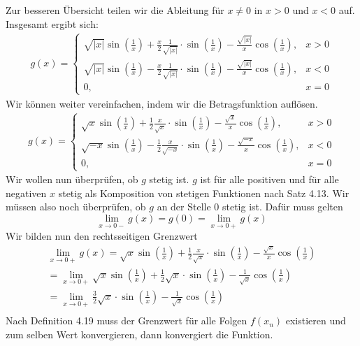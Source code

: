 \documentclass{article}
\begin{document}
    Zur besseren Übersicht teilen wir die Ableitung für \(x \neq 0\) in \(x > 0\) und \(x < 0\) auf. Insgesamt ergibt sich:
    \begin{gather*}
        g(x) = 
        \begin{cases}
            \sqrt{|x|} \sin(\frac{1}{x}) + \frac{x}{2} \frac{1}{\sqrt{|x|}} \cdot \sin(\frac{1}{x}) - \frac{ \sqrt{|x|} }{x} \cos(\frac{1}{x}), & x > 0 \\
            \sqrt{|x|} \sin(\frac{1}{x}) - \frac{x}{2} \frac{1}{\sqrt{|x|}} \cdot \sin(\frac{1}{x}) - \frac{ \sqrt{|x|} }{x} \cos(\frac{1}{x}), & x < 0 \\
            0, & x = 0
        \end{cases}
    \end{gather*}
    Wir können weiter vereinfachen, indem wir die Betragsfunktion auflösen.
    \begin{gather*}
        g(x) = 
        \begin{cases}
            \sqrt{x} \sin(\frac{1}{x}) + \frac{1}{2} \frac{x}{\sqrt{x}} \cdot \sin(\frac{1}{x}) - \frac{ \sqrt{x} }{x} \cos(\frac{1}{x}), & x > 0 \\
            \sqrt{-x} \sin(\frac{1}{x}) - \frac{1}{2} \frac{x}{\sqrt{-x}} \cdot \sin(\frac{1}{x}) - \frac{ \sqrt{-x} }{x} \cos(\frac{1}{x}), & x < 0 \\
            0, & x = 0
        \end{cases}
    \end{gather*}
    Wir wollen nun überprüfen, ob \(g\) stetig ist. \(g\) ist für alle positiven und für alle negativen \(x\) stetig als Komposition von stetigen Funktionen nach Satz 4.13.
    Wir müssen also noch überprüfen, ob \(g\) an der Stelle 0 stetig ist. Dafür muss gelten
    \[ \lim_{x \to 0 -} g(x) = g(0) = \lim_{x \to 0 +} g(x) \]
    Wir bilden nun den rechtsseitigen Grenzwert
    \begin{gather*}
        \lim_{x \to 0 +} g(x) = \sqrt{x} \sin(\frac{1}{x}) + \frac{1}{2} \frac{x}{\sqrt{x}} \cdot \sin(\frac{1}{x}) - \frac{ \sqrt{x} }{x} \cos(\frac{1}{x}) \\
        = \lim_{x \to 0 +} \sqrt{x} \sin(\frac{1}{x}) + \frac{1}{2} \sqrt{x} \cdot \sin(\frac{1}{x}) - \frac{1}{\sqrt{x}} \cos(\frac{1}{x}) \\
        = \lim_{x \to 0 +} \frac{3}{2} \sqrt{x} \cdot \sin(\frac{1}{x}) - \frac{1}{\sqrt{x}} \cos(\frac{1}{x}) \\
    \end{gather*}
    Nach Definition 4.19 muss der Grenzwert für alle Folgen \(f(x_n)\) existieren und zum selben Wert konvergieren, dann konvergiert die Funktion. \\
\end{document}
